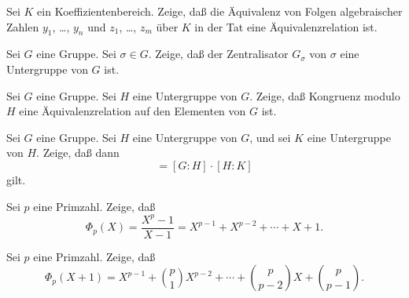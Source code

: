 \documentclass{algsheet}
\author{Dipl.-Math.~Arturo Mancino}
\date{19.~Januar 2011}
\begin{document}
                \maketitle



\begin{exercise}
    Sei \(K\) ein Koeffizientenbereich. Zeige, daß die Äquivalenz von
    Folgen algebraischer Zahlen \(y_1\), \dots, \(y_n\) und \(z_1\), \dots, \(z_m\)
    über \(K\) in der Tat eine Äquivalenzrelation ist.
\end{exercise}



\begin{exercise}
    Sei \(G\) eine Gruppe. Sei \(\sigma \in G\). Zeige, daß der Zentralisator \(G_\sigma\) von \(\sigma\)
    eine Untergruppe von \(G\) ist.
\end{exercise}



\begin{exercise}
    Sei \(G\) eine Gruppe. Sei \(H\) eine Untergruppe von \(G\). Zeige, daß Kongruenz modulo \(H\) eine
    Äquivalenzrelation auf den Elementen von \(G\) ist.
\end{exercise}


\begin{exercise}
    Sei \(G\) eine Gruppe. Sei \(H\) eine Untergruppe von \(G\), und sei \(K\) eine Untergruppe von \(H\).
    Zeige, daß dann
    \begin{equation}
        [G : K] = [G : H] \cdot [H : K]
    \end{equation}
    gilt.
\end{exercise}



\begin{exercise}
    Sei \(p\) eine Primzahl. Zeige, daß
    \begin{equation}
        \Phi_p(X) = \frac{X^p - 1}{X - 1} = X^{p - 1} + X^{p - 2} + \dotsb + X + 1.
    \end{equation}
\end{exercise}

\begin{exercise}
    Sei \(p\) eine Primzahl. Zeige, daß
    \begin{equation}
        \Phi_p(X + 1) = X^{p - 1} + \binom p 1 X^{p - 2} + \dotsb + \binom p {p - 2} X + \binom p {p - 1}.
    \end{equation}
\end{exercise}
\end{document}
